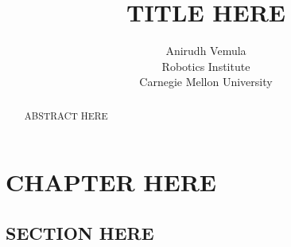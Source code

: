 \documentclass[12pt]{report}
\title{%
\textbf{TITLE HERE}
}
\author{
  Anirudh Vemula \\
  Robotics Institute \\
  Carnegie Mellon University
}
\begin{document}
\maketitle
\bigskip

\begin{abstract}
  ABSTRACT HERE
\end{abstract}


\clearpage
\glsresetall{}

\tableofcontents

\clearpage

\chapter{CHAPTER HERE}
\label{cha:chapter-here}

\section{SECTION HERE}
\label{sec:section-here}


%

\clearpage




\clearpage
\appendix

%
\end{document}
